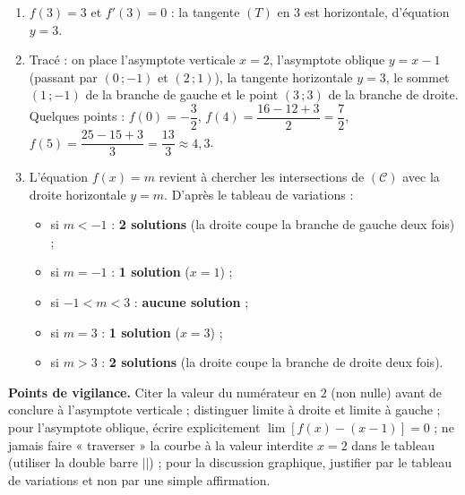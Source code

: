 \documentclass[11pt]{article}
\begin{document}
\begin{corrige}
\begin{enumerate}
$f(1) = \dfrac{1 - 3 + 3}{-1} = -1$ (maximum local) ; $f(3) = \dfrac{9 - 9 + 3}{1} = 3$ (minimum local).
\begin{center}
\begin{tabular}{|c|c|c|c|c||c|c|c|c|cc|}\hline
$x$ & $-\infty$ & & $1$ & & $2^-$ & $2^+$ & & $3$ & & $+\infty$ \\ \hline
$f'(x)$ & & $+$ & $0$ & $-$ & & & $-$ & $0$ & $+$ & \\ \hline
$f$ & $-\infty$ & $\nearrow$ & $-1$ & $\searrow$ & $-\infty$ & $+\infty$ & $\searrow$ & $3$ & $\nearrow$ & $+\infty$ \\ \hline
\end{tabular}
\end{center}
\item $f(3) = 3$ et $f'(3) = 0$ : la tangente $(T)$ en $3$ est horizontale, d'équation $\boxed{y = 3}$.
\item Tracé : on place l'asymptote verticale $x = 2$, l'asymptote oblique $y = x - 1$ (passant par $(0\,; -1)$ et $(2\,; 1)$), la tangente horizontale $y = 3$, le sommet $(1\,; -1)$ de la branche de gauche et le point $(3\,; 3)$ de la branche de droite. Quelques points : $f(0) = -\dfrac{3}{2}$, $f(4) = \dfrac{16 - 12 + 3}{2} = \dfrac{7}{2}$, $f(5) = \dfrac{25 - 15 + 3}{3} = \dfrac{13}{3} \approx 4{,}3$.
\item L'équation $f(x) = m$ revient à chercher les intersections de $(\mathcal{C})$ avec la droite horizontale $y = m$. D'après le tableau de variations :
\begin{itemize}
\item si $m < -1$ : \textbf{2 solutions} (la droite coupe la branche de gauche deux fois) ;
\item si $m = -1$ : \textbf{1 solution} ($x = 1$) ;
\item si $-1 < m < 3$ : \textbf{aucune solution} ;
\item si $m = 3$ : \textbf{1 solution} ($x = 3$) ;
\item si $m > 3$ : \textbf{2 solutions} (la droite coupe la branche de droite deux fois).
\end{itemize}
\end{enumerate}

\textbf{Points de vigilance.} Citer la valeur du numérateur en $2$ (non nulle) avant de conclure à l'asymptote verticale ; distinguer limite à droite et limite à gauche ; pour l'asymptote oblique, écrire explicitement $\lim [f(x) - (x-1)] = 0$ ; ne jamais faire « traverser » la courbe à la valeur interdite $x = 2$ dans le tableau (utiliser la double barre $||$) ; pour la discussion graphique, justifier par le tableau de variations et non par une simple affirmation.
\end{corrige}
\end{document}
